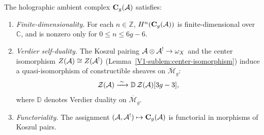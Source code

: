 \begin{proposition}
\label{prop:thqg-III-ambient-properties}
The holographic ambient complex
$\mathbf{C}_g(\mathcal{A})$ satisfies:
\begin{enumerate}[label=\textup{(\roman*)}]
\item \emph{Finite-dimensionality.}
 For each $n \in \mathbb{Z}$,
 $H^n(\mathbf{C}_g(\mathcal{A}))$ is finite-dimensional over
 $\mathbb{C}$, and is nonzero only for
 $0 \le n \le 6g - 6$.

\item \emph{Verdier self-duality.}
 The Koszul pairing
 $\mathcal{A} \otimes \mathcal{A}^! \to \omega_X$ and the center isomorphism
 $Z(\mathcal{A}) \cong Z(\mathcal{A}^!)$
 (Lemma~\ref{V1-sublem:center-isomorphism}) induce a
 quasi-isomorphism of constructible sheaves on
 $\overline{\mathcal{M}}_g$:
 \begin{equation}%
 \mathcal{Z}(\cA)
 \xrightarrow{\;\sim\;}
 \mathbb{D}\,\mathcal{Z}(\cA)[3g - 3],
 \end{equation}
 where $\mathbb{D}$ denotes Verdier duality on
 $\overline{\mathcal{M}}_g$.

\item \emph{Functoriality.}
 The assignment $(\mathcal{A}, \mathcal{A}^!) \mapsto \mathbf{C}_g(\mathcal{A})$
 is functorial in morphisms of Koszul pairs.
\end{enumerate}
\end{proposition}

